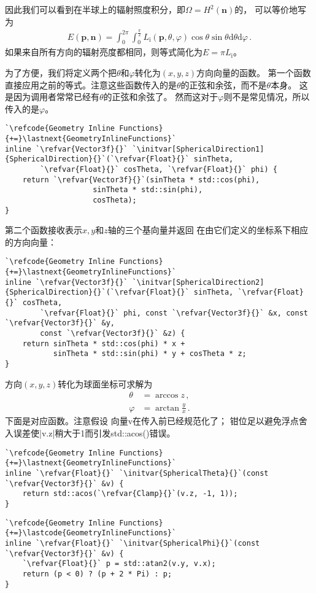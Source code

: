 因此我们可以看到在半球上的辐射照度积分，即$\Omega=H^2({\bm n})$的，
可以等价地写为
\begin{align*}
    E({\bm p},{\bm n})=\int_0^{2\pi}\int_0^{\frac{\pi}{2}}L_{\mathrm{i}}({\bm p},\theta,\varphi)\cos\theta\sin\theta\mathrm{d}\theta\mathrm{d}\varphi\, .
\end{align*}
如果来自所有方向的辐射亮度都相同，则等式简化为$E=\pi L_{\mathrm{i}}$。

为了方便，我们将定义两个把$\theta$和$\varphi$转化为$(x,y,z)$方向向量的函数。
第一个函数直接应用之前的等式。注意这些函数传入的是$\theta$的正弦和余弦，而不是$\theta$本身。
这是因为调用者常常已经有$\theta$的正弦和余弦了。
然而这对于$\varphi$则不是常见情况，所以传入的是$\varphi$。
\begin{lstlisting}
`\refcode{Geometry Inline Functions}{+=}\lastnext{GeometryInlineFunctions}`
inline `\refvar{Vector3f}{}` `\initvar[SphericalDirection1]{SphericalDirection}{}`(`\refvar{Float}{}` sinTheta, 
        `\refvar{Float}{}` cosTheta, `\refvar{Float}{}` phi) {
    return `\refvar{Vector3f}{}`(sinTheta * std::cos(phi), 
                    sinTheta * std::sin(phi),
                    cosTheta);
}
\end{lstlisting}

第二个函数接收表示$x,y$和$z$轴的三个基向量并返回
在由它们定义的坐标系下相应的方向向量：
\begin{lstlisting}
`\refcode{Geometry Inline Functions}{+=}\lastnext{GeometryInlineFunctions}`
inline `\refvar{Vector3f}{}` `\initvar[SphericalDirection2]{SphericalDirection}{}`(`\refvar{Float}{}` sinTheta, `\refvar{Float}{}` cosTheta, 
        `\refvar{Float}{}` phi, const `\refvar{Vector3f}{}` &x, const `\refvar{Vector3f}{}` &y,
        const `\refvar{Vector3f}{}` &z) {
    return sinTheta * std::cos(phi) * x +
           sinTheta * std::sin(phi) * y + cosTheta * z;
}
\end{lstlisting}

方向$(x,y,z)$转化为球面坐标可求解为
\begin{align*}
    \theta  & =\arccos z\, ,          \\
    \varphi & =\arctan\frac{y}{x}\, .
\end{align*}
下面是对应函数。注意假设
向量{\ttfamily v}在传入前已经规范化了；
钳位足以避免浮点舍入误差使{\ttfamily |v.z|}稍大于1而引发{\ttfamily std::acos()}错误。
\begin{lstlisting}
`\refcode{Geometry Inline Functions}{+=}\lastnext{GeometryInlineFunctions}`
inline `\refvar{Float}{}` `\initvar{SphericalTheta}{}`(const `\refvar{Vector3f}{}` &v) {
    return std::acos(`\refvar{Clamp}{}`(v.z, -1, 1));
}
\end{lstlisting}
\begin{lstlisting}
`\refcode{Geometry Inline Functions}{+=}\lastcode{GeometryInlineFunctions}`
inline `\refvar{Float}{}` `\initvar{SphericalPhi}{}`(const `\refvar{Vector3f}{}` &v) {
    `\refvar{Float}{}` p = std::atan2(v.y, v.x);
    return (p < 0) ? (p + 2 * Pi) : p;
}
\end{lstlisting}

